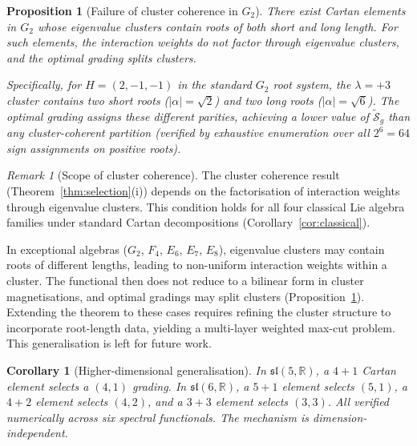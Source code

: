 \documentclass[11pt]{article}
\theoremstyle{plain}
\newtheorem{corollary}[theorem]{Corollary}
\newtheorem{proposition}[theorem]{Proposition}
\theoremstyle{definition}
\theoremstyle{remark}
\newtheorem*{remark}{Remark}
\newcommand{\sln}[1]{\mathfrak{sl}(#1,\mathbb{R})}
\begin{document}
\begin{proposition}[Failure of cluster coherence in $G_2$]
\label{prop:G2}
There exist Cartan elements in $G_2$ whose eigenvalue clusters
contain roots of both short and long length.  For such elements,
the interaction weights do not factor through eigenvalue clusters,
and the optimal grading splits clusters.

Specifically, for $H = (2, -1, -1)$ in the standard $G_2$ root
system, the $\lambda = +3$ cluster contains two short roots
($|\alpha| = \sqrt{2}$) and two long roots ($|\alpha| = \sqrt{6}$).
The optimal grading assigns these different parities, achieving a
lower value of $\widetilde{\mathcal{S}}_g$ than any cluster-coherent
partition (verified by exhaustive enumeration over all $2^6 = 64$
sign assignments on positive roots).
\end{proposition}

\begin{remark}[Scope of cluster coherence]
\label{rem:scope}
The cluster coherence result (Theorem~\ref{thm:selection}(i))
depends on the factorisation of interaction weights through
eigenvalue clusters.  This condition holds for all four classical
Lie algebra families under standard Cartan decompositions
(Corollary~\ref{cor:classical}).

In exceptional algebras ($G_2$, $F_4$, $E_6$, $E_7$, $E_8$),
eigenvalue clusters may contain roots of different lengths,
leading to non-uniform interaction weights within a cluster.
The functional then does not reduce to a bilinear form in
cluster magnetisations, and optimal gradings may split clusters
(Proposition~\ref{prop:G2}).  Extending the theorem to these
cases requires refining the cluster structure to incorporate
root-length data, yielding a multi-layer weighted max-cut
problem.  This generalisation is left for future work.
\end{remark}

\begin{corollary}[Higher-dimensional generalisation]
\label{cor:higher}
In $\sln{5}$, a $4{+}1$ Cartan element selects a $(4,1)$ grading.
In $\sln{6}$, a $5{+}1$ element selects $(5,1)$, a $4{+}2$ element
selects $(4,2)$, and a $3{+}3$ element selects $(3,3)$.  All verified
numerically across six spectral functionals.  The mechanism is
dimension-independent.
\end{corollary}
\end{document}
